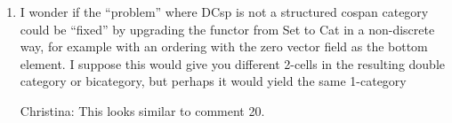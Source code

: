 \documentclass[reqno]{amsart}
\def\chris{\color{purple} Christina: }
\def\john{\color{red} John: }
\def\kenny{\color{blue} Kenny: }
\begin{document}
\begin{enumerate}
{\bf We have added a paragraph right below the statement of Theorem 4.1, clarifying its assumptions as suggested, which also incorporates an 
explanatory paragraph previously located under Corollary 4.3.} {\chris $\checkmark$} {\kenny $\checkmark$} {\john $\checkmark$} 

\item I wonder if the “problem” where DCsp is not a structured cospan category could be “fixed” by upgrading the functor from Set to Cat in a 
non-discrete 
way, for example with an ordering with the zero vector field as the bottom element. I suppose this would give you different 2-cells in the resulting 
double category or bicategory, but perhaps it would yield the same 1-category

{\chris This looks similar to comment 20.}
\end{enumerate}
\end{document}
